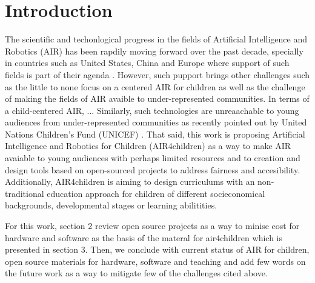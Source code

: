 \documentclass[sigconf]{acmart}
\begin{document}
\maketitle

\section{Introduction} 
The scientific and techonlogical progress in the fields of Artificial Intelligence and Robotics (AIR) has been rapdily moving forward over the past decade, specially in countries such as United States, China and Europe where support of such fields is part of their agenda \cite{Savage2020}. 
However, such pupport brings other challenges such as the little to none focus on a centered AIR for children as well as the challenge of making the fields of AIR avaible to under-represented communities.
In terms of a child-centered AIR, ...
Similarly, such technologies are unreaachable to young audiences from under-represented communities as recently pointed out by United Nations Children's Fund (UNICEF) \cite{UNICEF2020}.
That said, this work is proposing Artificial Intelligence and Robotics for Children (AIR4children) as a way to make AIR avaiable to young audiences with perhaps limited resources and to creation and design tools based on open-sourced projects to address fairness and accesibility. 
Additionally, AIR4children is aiming to design curriculums with an non-traditional education approach for children of different socieconomical backgrounds, developmental stages or learning abilitities. 

For this work, section 2 review open source projects as a way to minise cost for hardware and software as the basis of the materal for air4children which is presented in section 3. 
Then, we conclude with current status of AIR for children, open source materials for hardware, software and teaching and add few words on the future work as a way to mitigate few of the challenges cited above. 
\end{document}

